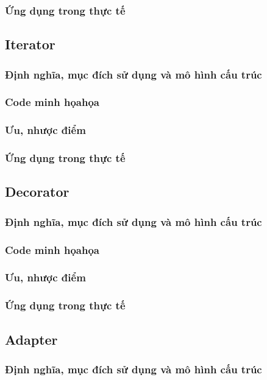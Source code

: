 \documentclass[14pt]{article}
\begin{document}
\subsubsection{ Ứng dụng trong thực tế}

\subsection{Iterator}
\subsubsection{ Định nghĩa, mục đích sử dụng và mô hình cấu trúc}
\subsubsection{ Code minh họahọa}
\subsubsection{ Ưu, nhược điểm}
\subsubsection{ Ứng dụng trong thực tế}

\subsection{Decorator}
\subsubsection{ Định nghĩa, mục đích sử dụng và mô hình cấu trúc}
\subsubsection{ Code minh họahọa}
\subsubsection{ Ưu, nhược điểm}
\subsubsection{ Ứng dụng trong thực tế}

\subsection{Adapter}
\subsubsection{ Định nghĩa, mục đích sử dụng và mô hình cấu trúc}
\end{document}
